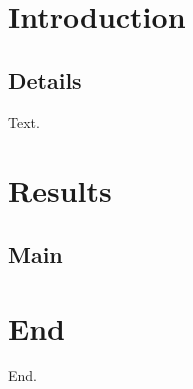 \documentclass{beamer}
\begin{document}
\section{Introduction}
\subsection{Details}
\begin{frame}
Text.
\end{frame}
\section{Results}
\subsection{Main}
\begin{frame}
\tableofcontents[currentsection]
\end{frame}
\section{End}
\begin{frame}
End.
\end{frame}
\end{document}
